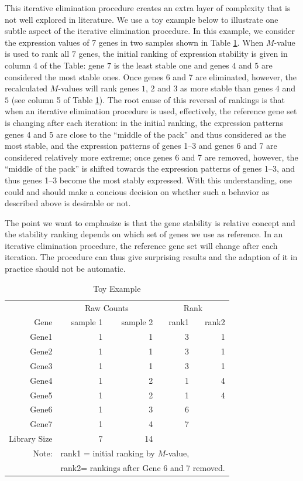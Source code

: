 \documentclass[11pt, a4paper]{article}
\begin{document}
This iterative elimination procedure creates an extra layer of complexity that
is not well explored in literature. We use a toy example below to illustrate
one subtle aspect of the iterative elimination procedure.  In this example, we
consider the expression values of 7 genes in two samples shown in Table
\ref{table:toyexample}. When $M$-value is used to rank all $7$ genes, the
initial ranking of expression stability is given in column 4 of the Table:
gene $7$ is the least stable one and genes $4$ and $5$ are considered the most
stable ones.  Once genes 6 and 7 are eliminated, however, the recalculated
$M$-values will rank genes $1$, $2$ and $3$ as more stable than genes $4$ and
$5$ (see column 5 of Table \ref{table:toyexample}). The root cause of this
reversal of rankings is that when an iterative elimination procedure is used,
effectively, the reference gene set is changing after each iteration: in the
initial ranking, the expression patterns genes 4 and 5 are close to the
``middle of the pack'' and thus considered as the most stable, and the
expression patterns of genes 1--3 and genes 6 and 7 are considered relatively
more extreme; once genes 6 and 7 are removed, however, the ``middle of the
pack'' is shifted towards the expression patterns of genes 1--3, and thus
genes 1--3 become the most stably expressed.  With this understanding, one
could and should make a concious decision on whether such a behavior as
described above is desirable or not.  

The point we want to emphasize is that the gene stability is relative concept
and the stability ranking depends on which set of genes we use as reference.
In an iterative elimination procedure, the reference gene set will change
after each iteration. The procedure can thus give surprising results and the
adaption of it in practice should not be automatic.

 
\begin{table}[ht] \centering \caption{Toy Example} \begin{tabular}{rrrrr}
    \hline & \multicolumn{2}{c}{Raw Counts} & \multicolumn{2}{c}{Rank}\\
     Gene & sample 1 & sample 2 & rank1 & rank2 \\ \hline 
    Gene1 & 1 & 1 & 3 & 1 \\ 
    Gene2 & 1 & 1 & 3 & 1 \\ 
    Gene3 & 1 & 1 & 3 & 1 \\
     Gene4 & 1 & 2 & 1 & 4 \\ 
     Gene5 & 1 & 2 & 1 & 4 \\ 
     Gene6 & 1 & 3 & 6 &  \\ 
    Gene7 & 1 & 4 & 7 &  \\ \hline 
    Library Size & 7 & 14 & & 	\\ \hline 
    Note: &\multicolumn{4}{l}{ rank1 = initial ranking by $M$-value, } \\
    & \multicolumn{4}{l}{ rank2= rankings after Gene 6 and 7 removed.}
\end{tabular} \label{table:toyexample} \end{table}
\end{document}
